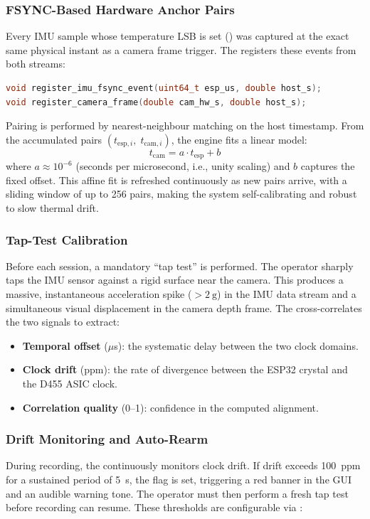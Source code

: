 \subsubsection{FSYNC-Based Hardware Anchor Pairs}
Every IMU sample whose temperature LSB is set () was captured at the exact same physical instant as a camera frame trigger.
The  registers these events from both streams:
\begin{lstlisting}[language=C++, numbers=none]
void register_imu_fsync_event(uint64_t esp_us, double host_s);
void register_camera_frame(double cam_hw_s, double host_s);
\end{lstlisting}
Pairing is performed by nearest-neighbour matching on the host timestamp.
From the accumulated pairs $(t_{\text{esp},i},\; t_{\text{cam},i})$, the engine fits a linear model:
\begin{equation}\label{eq:affine_sync}
  t_\text{cam} = a \cdot t_\text{esp} + b
\end{equation}
where $a \approx 10^{-6}$ (seconds per microsecond, i.e., unity scaling) and $b$ captures the fixed offset.
This affine fit is refreshed continuously as new pairs arrive, with a sliding window of up to 256 pairs, making the system self-calibrating and robust to slow thermal drift.

\subsubsection{Tap-Test Calibration}
Before each session, a mandatory ``tap test'' is performed.
The operator sharply taps the IMU sensor against a rigid surface near the camera.
This produces a massive, instantaneous acceleration spike ($>\SI{2}{\g}$) in the IMU data stream and a simultaneous visual displacement in the camera depth frame.
The  cross-correlates the two signals to extract:
\begin{itemize}[nosep]
  \item \textbf{Temporal offset} ($\mu$s): the systematic delay between the two clock domains.
  \item \textbf{Clock drift} (ppm): the rate of divergence between the ESP32 crystal and the D455 ASIC clock.
  \item \textbf{Correlation quality} (0--1): confidence in the computed alignment.
\end{itemize}

\subsubsection{Drift Monitoring and Auto-Rearm}
During recording, the  continuously monitors clock drift.
If drift exceeds \SI{100}{ppm} for a sustained period of \SI{5}{\second}, the  flag is set, triggering a red banner in the GUI and an audible warning tone.
The operator must then perform a fresh tap test before recording can resume.
These thresholds are configurable via :

